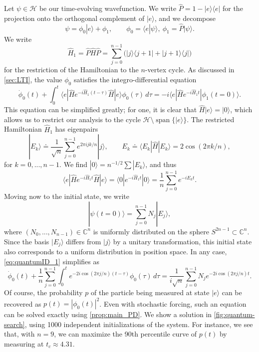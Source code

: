 \documentclass{cams-l} %
\newcommand{\CC}{\mathbb C}
\newcommand{\cH}{\mathcal H}
\newcommand{\op}{\operatorname}
\theoremstyle{definition}
\theoremstyle{remark}
\numberwithin{equation}{section}
\begin{document}
Let $\psi\in\cH$ be our time-evolving wavefunction. We write $\hat{P} = 1 - |e\rangle\langle e|$ for the projection onto the orthogonal complement of $|e\rangle$, and we decompose
\[\psi = \phi_0|e\rangle + \phi_1,\qquad \phi_0 = \langle e|\psi\rangle,\ \phi_1 = \hat{P}|\psi\rangle.\]
We write 
\[\hat{H}_1 = \hat{P}\hat{H}\hat{P} = \sum_{j=0}^{n-1}\Big(|j\rangle\langle j+1| + |j+1\rangle\langle j|\Big)\]
for the restriction of the Hamiltonian to the $n$-vertex cycle. As discussed in \cref{sec:LTI}, the value $\phi_0$ satisfies the integro-differential equation
\begin{equation}\label{eq:quantumID_1}
    \dot{\phi}_0(t) + \int_0^t\langle e|\hat{H}e^{-i\hat{H}_1(t-\tau)}\hat{H}|e\rangle\phi_0(\tau)\,d\tau = -i\langle e|\hat{H} e^{-i\hat{H}_1t}|\phi_1(t=0)\rangle.
\end{equation}
This equation can be simplified greatly; for one, it is clear that $\hat{H}|e\rangle = |0\rangle$, which allows us to restrict our analysis to the cycle $\cH\setminus\op{span}\{|e\rangle\}$. The restricted Hamiltonian $\hat{H}_1$ has eigenpairs
\[|E_k\rangle \doteq \frac{1}{\sqrt{n}}\sum_{j=0}^{n-1}e^{2\pi i jk/n}|j\rangle,\qquad E_k \doteq \langle E_k|\hat{H}|E_k\rangle = 2\cos(2\pi k/n),\]
for $k=0,...,n-1$. We find $|0\rangle = n^{-1/2}\sum |E_k\rangle$, and thus
\[\langle e|\hat{H}e^{-i\hat{H}_1t}\hat{H}|e\rangle = \langle 0| e^{-i\hat{H}_1t} |0\rangle = \frac{1}{n}\sum_{j=0}^{n-1} e^{-iE_k t}.\]
Moving now to the initial state, we write
\[|\psi(t=0)\rangle = \sum_{j=0}^{n-1}N_j|E_j\rangle,\]
where $(N_0,...,N_{n-1})\in\CC^n$ is uniformly distributed on the sphere $S^{2n-1}\subset\CC^n$. Since the basis $|E_j\rangle$ differs from $|j\rangle$ by a unitary transformation, this initial state also corresponds to a uniform distribution in position space. In any case, \cref{eq:quantumID_1} simplifies as
\begin{equation}\label{eq:phi0_walk}
    \dot{\phi}_0(t) + \frac{1}{n}\sum_{j=0}^{n-1}\int_0^t  e^{-2i\cos(2\pi j/n)(t-\tau)}\phi_0(\tau)\,d\tau = \frac{1}{i\sqrt{n}}\sum_{j=0}^{n-1} N_je^{-2i\cos(2\pi j/n)t}.
\end{equation}
Of course, the probability $p$ of the particle being measured at state $|e\rangle$ can be recovered as $p(t)=|\phi_0(t)|^2$. Even with stochastic forcing, such an equation can be solved exactly using \cref{prop:main_PD}. We show a solution in \cref{fig:quantum-search}, using 1000 independent initializations of the system. For instance, we see that, with $n=9$, we can maximize the 90th percentile curve of $p(t)$ by measuring at $t_c \approx 4.31$.
\end{document}
